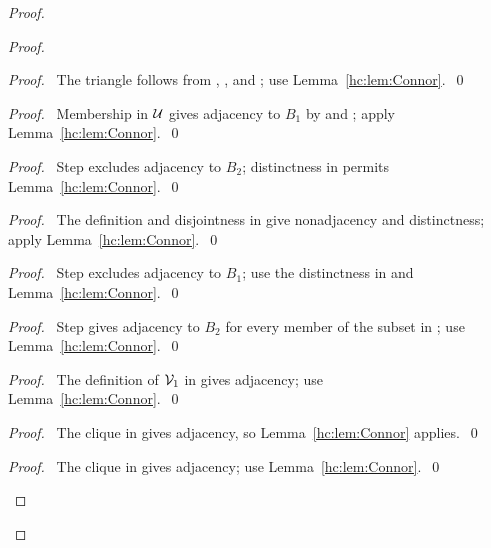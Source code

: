 \begin{mergedproofsection}
\begin{proof}
\begin{proof}
  \begin{proof}\pf\ The triangle follows from ,
   , and ;
   use Lemma~\ref{hc:lem:Connor}.~\qed\end{proof}
  \begin{proof}\pf\ Membership in ${\mathcal U}$ gives adjacency to $B_1$
   by  and ;
   apply Lemma~\ref{hc:lem:Connor}.~\qed\end{proof}
  \begin{proof}\pf\ Step  excludes adjacency
   to $B_2$; distinctness in  permits
   Lemma~\ref{hc:lem:Connor}.~\qed\end{proof}
  \begin{proof}\pf\ The definition and disjointness in
    give nonadjacency and distinctness;
   apply Lemma~\ref{hc:lem:Connor}.~\qed\end{proof}
  \begin{proof}\pf\ Step  excludes adjacency
   to $B_1$; use the distinctness in  and
   Lemma~\ref{hc:lem:Connor}.~\qed\end{proof}
  \begin{proof}\pf\ Step  gives adjacency to
   $B_2$ for every member of the subset in ;
   use Lemma~\ref{hc:lem:Connor}.~\qed\end{proof}
  \begin{proof}\pf\ The definition of ${\mathcal V}_1$ in
    gives adjacency; use Lemma~\ref{hc:lem:Connor}.~\qed\end{proof}
  \begin{proof}\pf\ The clique in  gives
   adjacency, so Lemma~\ref{hc:lem:Connor} applies.~\qed\end{proof}
  \begin{proof}\pf\ The clique in  gives
   adjacency; use Lemma~\ref{hc:lem:Connor}.~\qed\end{proof}

\end{proof}
\end{proof}
\end{mergedproofsection}
